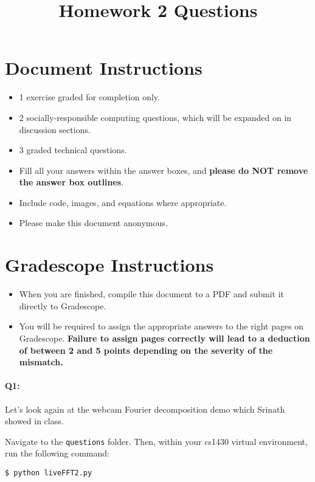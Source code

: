 \date{}

\title{\vspace{-1cm}Homework 2 Questions}



\maketitle
\vspace{-3cm}
\thispagestyle{fancy}

\section*{ Document Instructions}
\begin{itemize}
  \item 1 exercise graded for completion only.
  \item 2 socially-responsible computing questions, which will be expanded on in discussion sections.
  \item 3 graded technical questions.
  \item Fill all your answers within the answer boxes, and \textbf{please do NOT remove the answer box outlines}.
  \item Include code, images, and equations where appropriate.
  \item Please make this document anonymous.
\end{itemize}

\section*{ Gradescope Instructions}
\begin{itemize}
  \item When you are finished, compile this document to a PDF and submit it directly to Gradescope. 
  \item You will be required to assign the appropriate answers to the right pages on Gradescope. \textbf{Failure to assign pages correctly will lead to a deduction of between 2 and 5 points depending on the severity of the mismatch.}
\end{itemize}
\pagebreak


\paragraph{Q1:} Let's look again at the webcam Fourier decomposition demo which Srinath showed in class. 

Navigate to the \texttt{questions} folder. Then, within your cs1430 virtual environment, run the following command:
\begin{verbatim}
$ python liveFFT2.py
\end{verbatim}

